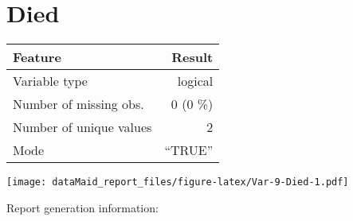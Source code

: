 \documentclass[]{report}
\newcommand{\fullline}{\noindent\makebox[\linewidth]{\rule{\textwidth}{0.4pt}}}
\newcommand{\bminione}{\begin{minipage}{0.75 \textwidth}}
\newcommand{\bminitwo}{\begin{minipage}{0.25 \textwidth}}
\newcommand{\emini}{\end{minipage}}
\begin{document}
\fullline

\hypertarget{died}{\section{Died}\label{died}}

\bminione

\begin{longtable}[]{@{}lr@{}}
\toprule
\begin{minipage}[b]{0.34\columnwidth}\raggedright\strut
Feature\strut
\end{minipage} & \begin{minipage}[b]{0.12\columnwidth}\raggedleft\strut
Result\strut
\end{minipage}\tabularnewline
\midrule
\endhead
\begin{minipage}[t]{0.34\columnwidth}\raggedright\strut
Variable type\strut
\end{minipage} & \begin{minipage}[t]{0.12\columnwidth}\raggedleft\strut
logical\strut
\end{minipage}\tabularnewline
\begin{minipage}[t]{0.34\columnwidth}\raggedright\strut
Number of missing obs.\strut
\end{minipage} & \begin{minipage}[t]{0.12\columnwidth}\raggedleft\strut
0 (0 \%)\strut
\end{minipage}\tabularnewline
\begin{minipage}[t]{0.34\columnwidth}\raggedright\strut
Number of unique values\strut
\end{minipage} & \begin{minipage}[t]{0.12\columnwidth}\raggedleft\strut
2\strut
\end{minipage}\tabularnewline
\begin{minipage}[t]{0.34\columnwidth}\raggedright\strut
Mode\strut
\end{minipage} & \begin{minipage}[t]{0.12\columnwidth}\raggedleft\strut
``TRUE''\strut
\end{minipage}\tabularnewline
\bottomrule
\end{longtable}

\emini
\bminitwo
\texttt{[image: dataMaid\_report\_files/figure-latex/Var-9-Died-1.pdf]}
\emini

\fullline

Report generation information:
\end{document}
